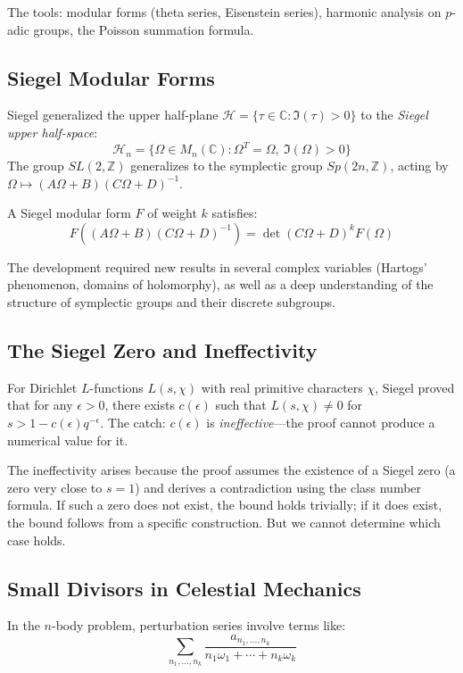 The tools: modular forms (theta series, Eisenstein series), harmonic analysis on $p$-adic groups, the Poisson summation formula.

\subsection{Siegel Modular Forms}

Siegel generalized the upper half-plane $\mathcal{H} = \{\tau \in \mathbb{C} : \Im(\tau) > 0\}$ to the \textit{Siegel upper half-space}:
\[
\mathcal{H}_n = \{\Omega \in M_n(\mathbb{C}) : \Omega^T = \Omega,\ \Im(\Omega) > 0\}
\]
The group $SL(2,\mathbb{Z})$ generalizes to the symplectic group $Sp(2n,\mathbb{Z})$, acting by $\Omega \mapsto (A\Omega + B)(C\Omega + D)^{-1}$.

A Siegel modular form $F$ of weight $k$ satisfies:
\[
F((A\Omega + B)(C\Omega + D)^{-1}) = \det(C\Omega + D)^k F(\Omega)
\]

The development required new results in several complex variables (Hartogs' phenomenon, domains of holomorphy), as well as a deep understanding of the structure of symplectic groups and their discrete subgroups.

\subsection{The Siegel Zero and Ineffectivity}

For Dirichlet $L$-functions $L(s,\chi)$ with real primitive characters $\chi$, Siegel proved that for any $\epsilon > 0$, there exists $c(\epsilon)$ such that $L(s,\chi) \neq 0$ for $s > 1 - c(\epsilon) q^{-\epsilon}$. The catch: $c(\epsilon)$ is \textit{ineffective}---the proof cannot produce a numerical value for it.

The ineffectivity arises because the proof assumes the existence of a Siegel zero (a zero very close to $s=1$) and derives a contradiction using the class number formula. If such a zero does not exist, the bound holds trivially; if it does exist, the bound follows from a specific construction. But we cannot determine which case holds.

\subsection{Small Divisors in Celestial Mechanics}

In the $n$-body problem, perturbation series involve terms like:
\[
\sum_{n_1,\dots,n_k} \frac{a_{n_1,\dots,n_k}}{n_1\omega_1 + \cdots + n_k\omega_k}
\]

